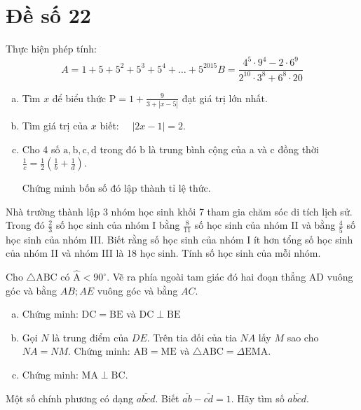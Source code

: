 \onehalfspacing
\section{Đề số 22}

\begin{bt} 
    Thực hiện phép tính:
    $$
    A=1+5+5^2+5^3+5^4+\ldots+5^{2015} B=\frac{4^5 \cdot 9^4-2 \cdot 6^9}{2^{10} \cdot 3^8+6^8 \cdot 20}
    $$
\loigiai{}
\end{bt}

\begin{bt}
    \hfill
	\begin{enumerate}[a.]
        \item Tìm $x$ để biểu thức $\mathrm{P}=1+\frac{9}{3+|x-5|}$ đạt giá trị lớn nhất.
        \item Tìm giá trị của $x$ biết: $\quad|2 x-1|=2$.
        \item Cho 4 số $\mathrm{a}, \mathrm{b}, \mathrm{c}, \mathrm{d}$ trong đó $\mathrm{b}$ là trung bình cộng của a và $\mathrm{c}$ đồng thời $\frac{1}{c}=\frac{1}{2}\left(\frac{1}{b}+\frac{1}{d}\right)$.
        
        Chứng minh bốn số đó lập thành tỉ lệ thức.
    \end{enumerate}
	\loigiai{} 
\end{bt}

\begin{bt}
    Nhà trường thành lập 3 nhóm học sinh khối 7 tham gia chăm sóc di tích lịch sử. Trong đó $\frac{2}{3}$ số học sinh của nhóm I bằng $\frac{8}{11}$ số học sinh của nhóm II và bằng $\frac{4}{5}$ số học sinh của nhóm III. Biết rằng số học sinh của nhóm I ít hơn tổng số học sinh của nhóm II và nhóm III là 18 học sinh. Tính số học sinh của mỗi nhóm.
	\loigiai{}
\end{bt}

\begin{bt}
    Cho $\triangle \mathrm{ABC}$ có $\hat{\mathrm{A}}<90^{\circ}$. Vẽ ra phía ngoài tam giác đó hai đoạn thẳng $\mathrm{AD}$ vuông góc và bằng $A B ; A E$ vuông góc và bằng $A C$.
    \begin{enumerate}[a.]
        \item Chứng minh: $\mathrm{DC}=\mathrm{BE}$ và $\mathrm{DC} \perp \mathrm{BE}$
        \item Gọi $N$ là trung điểm của $DE$. Trên tia đối của tia $NA$ lấy $M$ sao cho $NA=NM$. Chứng minh: $\mathrm{AB}=\mathrm{ME}$ và $\triangle \mathrm{ABC}=\Delta \mathrm{EMA}$.
        \item Chứng minh: $\mathrm{MA} \perp \mathrm{BC}$.
    \end{enumerate}
\loigiai{}
\end{bt}

\begin{bt}
    Một số chính phương có dạng $\overline{a b c d}$. Biết $\overline{a b}-\overline{c d}=1$. Hãy tìm số $\overline{a b c d}$.
\loigiai{}
\end{bt}

